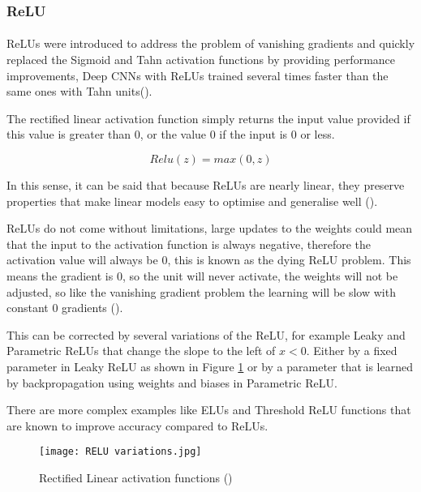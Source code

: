\subsubsection{\gls{ReLU}}
\paragraph{}
\gls{ReLU}s were introduced to address the problem of vanishing gradients and quickly replaced the Sigmoid and Tahn activation functions by providing  performance improvements, Deep \gls{CNN}s with \gls{ReLU}s trained several times faster than the same ones with Tahn units(\cite{GoodBengCour16}).

The rectified linear activation function simply returns the input value provided if this value is greater than 0, or the value 0 if the input is 0 or less.

\begin{equation}
    \label{eq_relu}
    Relu(z) = max(0, z)
\end{equation}

In this sense, it can be said that because \gls{ReLU}s are nearly linear, they preserve properties that make linear models easy to optimise and generalise well (\cite{GoodBengCour16}).

\gls{ReLU}s do not come without limitations, large updates to the weights could mean that the input to the activation function is always negative, therefore the activation value will always be $0$, this is known as the dying \gls{ReLU} problem.
This means the gradient is $0$, so the unit will never activate, the weights will not be adjusted, so like the vanishing gradient problem the learning will be slow with constant 0 gradients (\cite{Maas13rectifiernonlinearities}).

This can be corrected by several variations of the \gls{ReLU}, for example Leaky and Parametric \gls{ReLU}s  that change the slope to the left of $x < 0$. Either by a fixed parameter in Leaky \gls{ReLU} as shown in Figure \ref{fig_relu} or by a parameter that is learned by backpropagation using weights and biases in Parametric \gls{ReLU}. 

There are more complex examples like \gls{ELU}s  and Threshold \gls{ReLU} functions that are known to improve accuracy compared to \gls{ReLU}s.

\begin{figure}[hbt!]
        \centering
        \texttt{[image: RELU variations.jpg]}
        \caption{Rectified Linear activation functions (\cite{leakyreluimg})}
        \label{fig_relu}
\end{figure}

